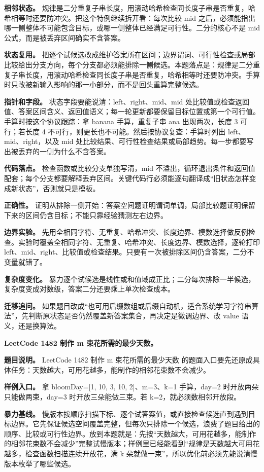 \textbf{相邻状态。} 规律是二分重复子串长度，用滚动哈希检查同长度子串是否重复，哈希相等时还要防冲突。把这个特例继续拆开看：每次比较 mid 之后，必须能指出哪一侧整体不可能包含目标，或哪一侧整体已经满足可行性。二分的核心不是 mid 公式，而是被丢弃区间确实不含答案。

\textbf{状态复用。} 把逐个试候选改成维护答案所在区间；边界谓词、可行性检查或局部比较给出分支方向，每个分支都必须能排除一侧候选。本题落点是：规律是二分重复子串长度，用滚动哈希检查同长度子串是否重复，哈希相等时还要防冲突。手算时只改被新输入影响的那一小部分，而不是回头重算完整候选。

\textbf{指针和字段。} 状态字段要能说清：left、right、mid、mid 处比较值或检查返回值、答案区间含义、返回值语义；每一轮更新都要保留目标位置或第一个可行值。手算时按这个协议跟踪：拿 banana 手算，重复子串 ana 出现两次，长度 3 可行；若长度 4 不可行，则更长也不可能。然后按协议复查：手算时列出 left、mid、right，以及 mid 处比较结果、可行性检查结果或局部趋势。每一步都要写出被丢弃的一侧为什么不含答案。

\textbf{代码落点。} 检查函数或比较分支单独写清，mid 不溢出，循环退出条件和返回值配套；每个分支都要解释丢弃区间。关键代码行必须能逐句翻译成“旧状态怎样变成新状态”，否则就只是模板。

\textbf{正确性。} 证明从排除一侧开始：答案空间题证明谓词单调，局部比较题证明保留下来的区间仍含目标；不能只靠经验猜测左右边界。

\textbf{边界实验。} 先用全相同字符、无重复、哈希冲突、长度边界、模数选择做反例检查。实验时覆盖全相同字符、无重复、哈希冲突、长度边界、模数选择，逐轮打印 left、mid、right、比较值或检查结果。只要有一次被排除区间仍含答案，二分不变量就错了。

\textbf{复杂度变化。} 暴力逐个试候选是线性或和值域成正比；二分每次排除一半候选，复杂度变成对数级，答案二分还要乘上单次检查成本。

\textbf{迁移追问。} 如果题目改成“也可用后缀数组或后缀自动机，适合系统学习字符串算法”，先判断原状态是否仍然覆盖新答案集合，再决定是微调边界、改 value 语义，还是换算法。

\noindent\textbf{LeetCode 1482 制作 m 束花所需的最少天数。}

\textbf{题目说明。} LeetCode 1482 制作 m 束花所需的最少天数 的题面入口要先还原成具体任务：天数越大，可用花越多，能制作的相邻花束数不会减少。

\textbf{样例入口。} 拿 bloomDay=[1, 10, 3, 10, 2]、m=3、k=1 手算，day=2 时开放两朵只能做两束，day=3 时开放三朵能做三束。若 k=2，就必须数相邻开放段。

\textbf{暴力基线。} 慢版本按顺序扫描下标、逐个试答案值，或直接检查候选直到遇到目标边界。它先保证候选空间覆盖完整，但每次只排除一个候选，浪费了题目给出的顺序、比较或可行性边界。放到本题就是：先按“天数越大，可用花越多，能制作的相邻花束数不会减少”完整试慢版本；样例里已经能看到“规律是天数越大可用花越多，检查函数扫描连续开放花，满 k 朵就做一束”，所以优化前必须先能说清慢版本枚举了哪些候选。

